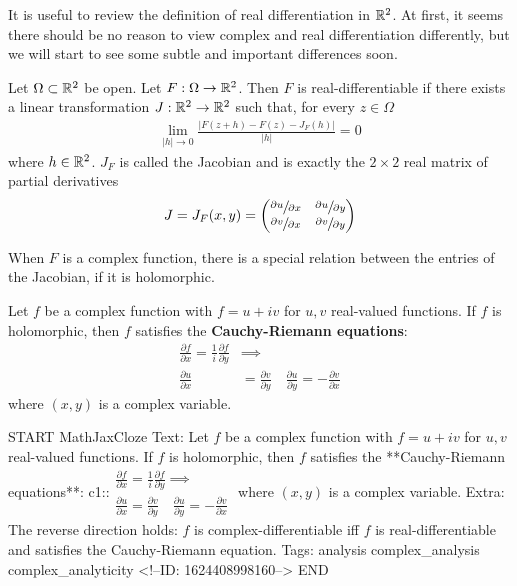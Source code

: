 \documentclass{memoir}
\begin{document}
It is useful to review the definition of real differentiation in \(\mathbb{R}^2\). At first, it seems there should be no reason to view complex and real differentiation differently, but we will start to see some subtle and important differences soon.
\begin{defn}
	Let \(\Omega\subset \mathbb{R}^2\) be open. Let \(F:\Omega\to \mathbb{R}^2\). Then \(F\) is real-differentiable if there exists a linear transformation \(J:\mathbb{R}^2\to \mathbb{R}^2\) such that, for every \(z \in \Omega\)
	\begin{align*}
		\lim_{\left| h \right|  \to 0} \frac{\left| F(z+h)-F(z)-J_F(h) \right| }{\left| h \right| } = 0
	\end{align*}
	where \(h \in \mathbb{R}^2\). \(J_F\) is called the Jacobian and is exactly the \(2\times 2\) real matrix of partial derivatives
\begin{align*}
	J = J_F(x,y) = \begin{pmatrix} \sfrac{\partial u}{\partial x} & \sfrac{\partial u}{\partial y} \\ \sfrac{\partial v}{\partial x} & \sfrac{\partial v}{\partial y}  \end{pmatrix} 
\end{align*}
\end{defn}
When \(F\) is a complex function, there is a special relation between the entries of the Jacobian, if it is holomorphic.

\begin{prop}
	Let \(f\) be a complex function with \(f = u + iv\) for \(u,v\) real-valued functions. If \(f\) is holomorphic, then \(f\) satisfies the \textbf{Cauchy-Riemann equations}:
\begin{align*}
	\frac{\partial f}{\partial x} = \frac{1}{i}\frac{\partial f}{\partial y} &\implies \\
	\frac{\partial u}{\partial x} &= \frac{\partial v}{\partial y} \quad \frac{\partial u}{\partial y} = -\frac{\partial v}{\partial x} 
\end{align*}
where \((x,y)\) is a complex variable.
\end{prop}

\begin{anki}
START
MathJaxCloze
Text: Let \(f\) be a complex function with \(f = u + iv\) for \(u,v\) real-valued functions. If \(f\) is holomorphic, then \(f\) satisfies the **Cauchy-Riemann equations**:
 {{c1::\(\begin{align*}
         	\frac{\partial f}{\partial x} = \frac{1}{i}\frac{\partial f}{\partial y} \implies \\
         	\frac{\partial u}{\partial x} = \frac{\partial v}{\partial y} \quad \frac{\partial u}{\partial y} = -\frac{\partial v}{\partial x} 
         \end{align*}\)}} 
where \((x,y)\) is a complex variable.
Extra: The reverse direction holds: \(f\) is complex-differentiable iff \(f\) is real-differentiable and satisfies the Cauchy-Riemann equation.
Tags: analysis complex_analysis complex_analyticity
<!--ID: 1624408998160-->
END
\end{anki}
\end{document}
